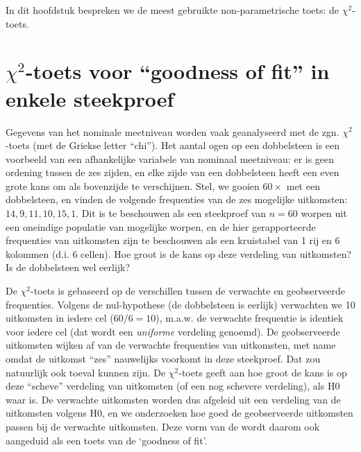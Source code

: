 \documentclass[
]{book}
\begin{document}
In dit hoofdstuk bespreken we de meest gebruikte non-parametrische
toets: de \(\chi^2\)-toets.

\section{\texorpdfstring{\(\chi^2\)-toets voor ``goodness of fit'' in enkele steekproef}{\textbackslash chi\^{}2-toets voor ``goodness of fit'' in enkele steekproef}}\label{sec:chi2gof}

Gegevens van het nominale meetniveau worden vaak geanalyseerd met de
zgn. \(\chi^2\)-toets (met de Griekse letter ``chi''). Het aantal ogen op een dobbelsteen
is een voorbeeld van een afhankelijke variabele van nominaal meetniveau:
er is geen ordening tussen de zes zijden, en elke zijde van een
dobbelsteen heeft een even grote kans om als bovenzijde te verschijnen.
Stel, we gooien \(60\times\) met een dobbelsteen, en vinden de volgende
frequenties van de zes mogelijke uitkomsten: \(14, 9, 11, 10, 15, 1\). Dit
is te beschouwen als een steekproef van \(n=60\) worpen uit een oneindige
populatie van mogelijke worpen, en de hier gerapporteerde frequenties
van uitkomsten zijn te beschouwen als een kruistabel van 1 rij en 6
kolommen (d.i. 6 cellen). Hoe groot is de kans op deze verdeling van
uitkomsten? Is de dobbelsteen wel eerlijk?

De \(\chi^2\)-toets is gebaseerd op de verschillen tussen de verwachte en geobserveerde
frequenties. Volgens de nul-hypothese (de dobbelsteen is eerlijk)
verwachten we 10 uitkomsten in iedere cel (\(60/6=10\)), m.a.w. de
verwachte frequentie is identiek voor iedere cel (dat wordt een \emph{uniforme} verdeling genoemd).
De geobserveerde
uitkomsten wijken af van de verwachte frequenties van uitkomsten, met
name omdat de uitkomst ``zes'' nauwelijks voorkomt in deze steekproef. Dat
zou natuurlijk ook toeval kunnen zijn. De \(\chi^2\)-toets geeft aan hoe groot de kans is
op deze ``scheve'' verdeling van uitkomsten (of een nog schevere verdeling), als H0 waar is.
De verwachte
uitkomsten worden dus afgeleid uit een verdeling van de uitkomsten
volgens H0, en we onderzoeken hoe goed de geobserveerde uitkomsten
passen bij de verwachte uitkomsten. Deze vorm van de wordt daarom ook
aangeduid als een toets van de `goodness of fit'.
\end{document}

